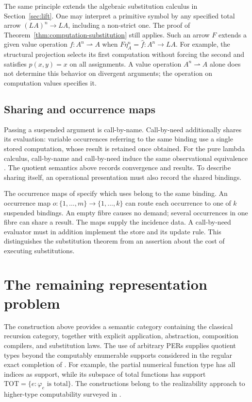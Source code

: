 \documentclass[11pt]{article}
\theoremstyle{definition}
\begin{document}
The same principle extends the algebraic substitution calculus in
Section~\ref{sec:lift}. One may interpret a primitive symbol by any
specified total arrow $(LA)^n\to LA$, including a non-strict one.
The proof of Theorem~\ref{thm:computation-substitution} still applies.
Such an arrow $F$ extends a given value operation
$f:A^n\rightharpoonup A$ when
$F\eta_A^n=\widehat f:A^n\to LA$.
For example, the structural projection selects its first computation
without forcing the second and satisfies $p(x,y)=x$ on all assignments.
A value operation $A^n\rightharpoonup A$ alone does not determine
this behavior on divergent arguments; the operation on computation
values specifies it.

\subsection{Sharing and occurrence maps}

Passing a suspended argument is call-by-name. Call-by-need additionally
shares its evaluation: variable occurrences referring to the same
binding use a single stored computation, whose result is retained once
obtained. For the pure lambda calculus, call-by-name and call-by-need
induce the same observational equivalence
\cite[Theorem 32]{MOW}. The quotient semantics above records
convergence and results. To describe sharing itself, an operational
presentation must also record the shared bindings.

The occurrence maps of \cite[Section 9]{Notation} specify which uses
belong to the same binding. An occurrence map
$o:\{1,\ldots,m\}\to\{1,\ldots,k\}$ can route each occurrence
to one of $k$ suspended bindings. An empty fibre causes no demand;
several occurrences in one fibre can share a result. The maps supply
the incidence data. A call-by-need evaluator must in addition implement
the store and its update rule. This distinguishes the substitution
theorem from an assertion about the cost of executing substitutions.

\section{The remaining representation problem}

The construction above provides a semantic category containing the
classical recursion category, together with explicit application,
abstraction, composition compilers, and substitution laws. The use of
arbitrary PERs supplies quotient types beyond the computably enumerable
supports considered in the regular exact completion of
\cite[section ``Total function spaces and finite observations'']{External}.
For example, the partial numerical function type has all indices as
support, while its subspace of total functions has support
$\mathrm{TOT}=\{e:\varphi_e\text{ is total}\}$.
The constructions belong to the realizability approach to higher-type
computability surveyed in \cite{Longley}.
\end{document}

